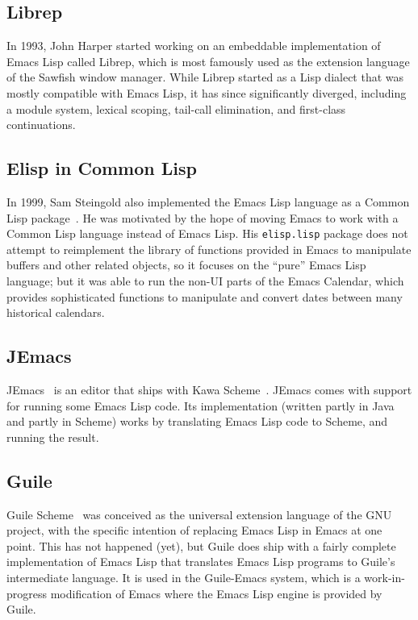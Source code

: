 \documentclass[format=acmsmall, review]{acmart}
\newcommand \Elisp {Emacs Lisp}
\begin{document}
\subsection{Librep}

In 1993, John Harper started working on an embeddable implementation of
\Elisp{} called Librep, which is most famously used as the extension
language of the Sawfish window manager.  While Librep started as a Lisp
dialect that was mostly compatible with \Elisp{}, it has since significantly
diverged, including a module system, lexical scoping, tail-call elimination,
and first-class continuations.

\subsection{Elisp in Common Lisp}

In 1999, Sam Steingold also implemented the \Elisp{} language as a Common
Lisp package~\cite{Steingold99}.  He was motivated by the hope of moving
Emacs to work with a Common Lisp language instead of \Elisp{}.
His \texttt{elisp.lisp} package does not attempt to reimplement the library
of functions provided in Emacs to manipulate buffers and other related
objects, so it focuses on the ``pure'' \Elisp{} language; but it was able to
run the non-UI parts of the Emacs Calendar, which provides sophisticated
functions to manipulate and convert dates between many historical calendars.

\subsection{JEmacs}

JEmacs~\cite{Bothner2001} is an editor that ships with Kawa
Scheme~\cite{KawaScheme}.  JEmacs comes with support for running some
\Elisp{} code.  Its implementation (written partly in Java and
partly in Scheme) works by translating \Elisp{} code to Scheme, and
running the result.

\subsection{Guile}

Guile Scheme~\cite{Guile2018} was conceived as the universal extension
language of the GNU project, with the specific intention of replacing
\Elisp{} in Emacs at one point.  This has not happened (yet), but Guile does
ship with a fairly complete implementation of \Elisp{} that translates
\Elisp{} programs to Guile's intermediate language.  It is used in the
Guile-Emacs system, which is a work-in-progress modification of Emacs where
the \Elisp{} engine is provided by Guile.
\end{document}
